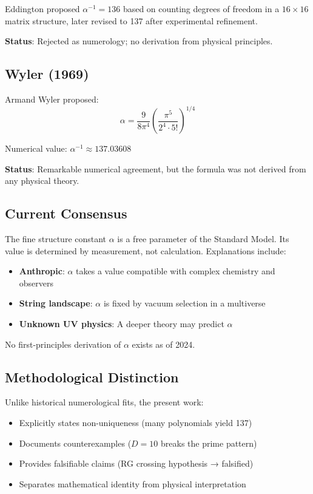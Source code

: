 \documentclass[11pt,a4paper]{article}
\begin{document}
Eddington proposed $\alpha^{-1} = 136$ based on counting degrees of freedom in a $16 \times 16$ matrix structure, later revised to 137 after experimental refinement.

\textbf{Status}: Rejected as numerology; no derivation from physical principles.

\subsection{Wyler (1969)}

Armand Wyler proposed:
\begin{equation}
\alpha = \frac{9}{8\pi^4} \left( \frac{\pi^5}{2^4 \cdot 5!} \right)^{1/4}
\end{equation}

Numerical value: $\alpha^{-1} \approx 137.03608$

\textbf{Status}: Remarkable numerical agreement, but the formula was not derived from any physical theory.

\subsection{Current Consensus}

The fine structure constant $\alpha$ is a free parameter of the Standard Model. Its value is determined by measurement, not calculation. Explanations include:
\begin{itemize}
    \item \textbf{Anthropic}: $\alpha$ takes a value compatible with complex chemistry and observers
    \item \textbf{String landscape}: $\alpha$ is fixed by vacuum selection in a multiverse
    \item \textbf{Unknown UV physics}: A deeper theory may predict $\alpha$
\end{itemize}

No first-principles derivation of $\alpha$ exists as of 2024.

\subsection{Methodological Distinction}

Unlike historical numerological fits, the present work:
\begin{itemize}
    \item Explicitly states non-uniqueness (many polynomials yield 137)
    \item Documents counterexamples ($D=10$ breaks the prime pattern)
    \item Provides falsifiable claims (RG crossing hypothesis → falsified)
    \item Separates mathematical identity from physical interpretation
\end{itemize}
\end{document}
